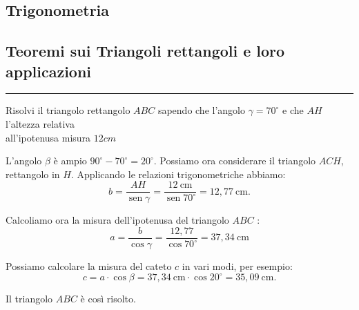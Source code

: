 \documentclass[12pt, a4paper]{exam}
\begin{document}
\newpage


\subsection*{Trigonometria}
\subsection*{Teoremi sui Triangoli rettangoli e loro applicazioni}
\vspace{12pt}
\hrule
\vspace{10pt}
\begin{questions}

  \addpoints
  \question[6]
  Risolvi il triangolo rettangolo $ABC$ sapendo che l'angolo $\gamma = 70^{\circ}$ e che $AH$ l'altezza relativa\\ all'ipotenusa misura $12 cm$

      \begin{solution}
        L'angolo $\beta$ è ampio $90^{\circ}-70^{\circ}=20^{\circ}$.
Possiamo ora considerare il triangolo $A C H$, rettangolo in $H$. Applicando le relazioni trigonometriche abbiamo:
$$
b=\dfrac{A H}{\operatorname{sen} \gamma}=\dfrac{12 \mathrm{~cm}}{\operatorname{sen} 70^{\circ}}=12,77 \mathrm{~cm} .
$$

Calcoliamo ora la misura dell'ipotenusa del triangolo $A B C$ :
$$
a=\dfrac{b}{\cos \gamma}=\dfrac{12,77}{\cos 70^{\circ}}=37,34 \mathrm{~cm}
$$

Possiamo calcolare la misura del cateto $c$ in vari modi, per esempio:
$$
c=a \cdot \cos \beta=37,34 \mathrm{~cm} \cdot \cos 20^{\circ}=35,09 \mathrm{~cm} .
$$

Il triangolo $A B C$ è così risolto.
      \end{solution}
      \begin{center}
      \end{center}


\end{questions}
\end{document}
